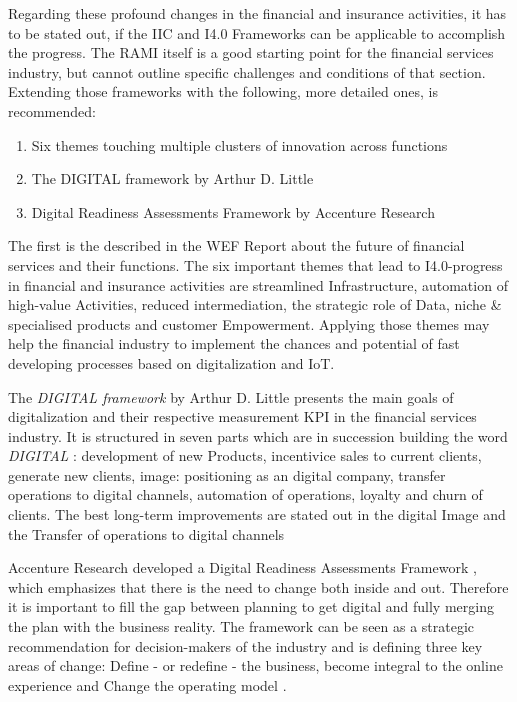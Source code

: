 Regarding these profound changes in the financial and insurance activities, it has to be stated out, if the \ac{IIC} and \ac{I4.0} Frameworks can be applicable to accomplish the progress. The \ac{RAMI} itself is a good starting point for the financial services industry, but cannot outline specific challenges and conditions of that section. Extending those frameworks with the following, more detailed ones, is recommended:

\begin{enumerate}
\item Six themes touching multiple clusters of innovation across functions \cite{WEF-futureFinancialServices}
\item The DIGITAL framework by Arthur D. Little \cite[]{ArthurDLittle-FinancialService}
\item Digital Readiness Assessments Framework by Accenture Research \cite{accenture-europeanFinancialServices-digitalReadinessReport}
\end{enumerate}

The first is the described in the \ac{WEF} \cite{WEF-futureFinancialServices} Report about the future of financial services and their functions. The six important themes that lead to \ac{I4.0}-progress in financial and insurance activities are streamlined Infrastructure, automation of high-value Activities, reduced intermediation, the strategic role of Data, niche \& specialised products and customer Empowerment. Applying those themes may help the financial industry to implement the chances and potential of fast developing processes based on digitalization and \ac{IoT}.

The \emph{DIGITAL framework} by Arthur D. Little \cite[]{ArthurDLittle-FinancialService} presents the main goals of digitalization and their respective measurement \ac{KPI} in the financial services industry. It is structured in seven parts which are in succession building the word \emph{DIGITAL} \cite{ArthurDLittle-FinancialService}: development of new Products, incentivice sales to current clients, generate new clients, image: positioning as an digital company, transfer operations to digital channels, automation of operations, loyalty and churn of clients. The best long-term improvements are stated out in the digital Image and the Transfer of operations to digital channels \cite{ArthurDLittle-FinancialService}

Accenture Research developed a Digital Readiness Assessments Framework \cite{accenture-europeanFinancialServices-digitalReadinessReport}, which emphasizes that there is the need to change both inside and out. Therefore it is important to fill the gap between planning to get digital and fully merging the plan with the business reality. The framework can be seen as a strategic recommendation for decision-makers of the industry and is defining three key areas of change: Define - or redefine - the business, become integral to the online experience and Change the operating model \cite{accenture-europeanFinancialServices-digitalReadinessReport}. 

